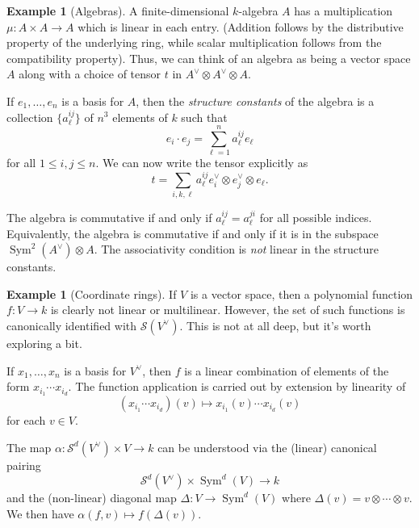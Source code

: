 \documentclass[12pt]{article}
\theoremstyle{plain}
\theoremstyle{definition}
\newtheorem{example}[theorem]{Example}
\theoremstyle{remark}
\numberwithin{equation}{section}
\begin{document}
\begin{example}[Algebras]
A finite-dimensional $k$-algebra $A$ has a multiplication $\mu: A \times
A \to A$ which is linear in each entry.
(Addition follows by the distributive property of the underlying ring,
while scalar multiplication follows from the compatibility property).
Thus, we can think of an algebra as being a vector space $A$
along with a choice of tensor $t$ in $A^\vee \otimes A^\vee \otimes A$.

If $e_1,\ldots,e_n$ is a basis for $A$,
then the \emph{structure constants} of the algebra
is a collection $\{ a^{ij}_\ell\}$ of $n^3$ elements of $k$ such that
\[
e_i\cdot e_j = \sum_{\ell=1}^n a^{ij}_\ell e_\ell
\]
for all $1 \le i,j \le n$.
We can now write the tensor explicitly as
\[
t = \sum_{i,k,\ell} a^{ij}_\ell e_i^\vee \otimes e_j^\vee \otimes
e_\ell.
\]

The algebra is commutative if and only if $a^{ij}_\ell=a^{ji}_\ell$
for all possible indices.  Equivalently, the algebra is commutative if
and only if it is in the subspace $\operatorname{Sym}^2(A^\vee) \otimes A$.
The associativity condition is \emph{not} linear in the structure
constants. 
\end{example}

\begin{example}[Coordinate rings]
If $V$ is a vector space, then a polynomial function $f: V \to k$
is clearly not linear or multilinear.  However, the set of such
functions is canonically identified with $\mathcal{S}(V^\vee)$.
This is not at all deep, but it's worth exploring a bit.

If $x_1,\ldots,x_n$ is a basis for $V^\vee$, then
$f$ is a linear combination of elements of the form
$x_{i_1}\cdots x_{i_d}$.  The function application is carried out
by extension by linearity of
\[
(x_{i_1}\cdots x_{i_d})(v) \mapsto x_{i_1}(v)\cdots x_{i_d}(v)
\]
for each $v \in V$.

The map $\alpha : \mathcal{S}^d(V^\vee) \times V \to k$
can be understood via the (linear) canonical pairing
\[
\mathcal{S}^d(V^\vee) \times \operatorname{Sym}^d(V) \to k
\]
and the (non-linear)
diagonal map $\Delta: V \to \operatorname{Sym}^d(V)$
where $\Delta(v) = v \otimes \cdots \otimes v$.
We then have $\alpha(f,v) \mapsto f(\Delta(v))$.
\end{example}




\end{document}
